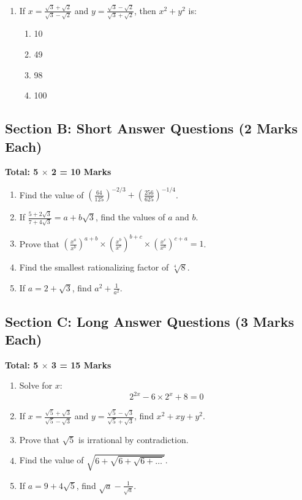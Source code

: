 \documentclass[12pt]{article}
\begin{document}
\begin{enumerate}[label=\arabic*.]
		\item If $x = \frac{\sqrt{3} + \sqrt{2}}{\sqrt{3} - \sqrt{2}}$ and $y = \frac{\sqrt{3} - \sqrt{2}}{\sqrt{3} + \sqrt{2}}$, then $x^2 + y^2$ is:
		\begin{enumerate}[label=\alph*)]
			\item 10
			\item 49
			\item 98
			\item 100
		\end{enumerate}
	\end{enumerate}
	
	\subsection*{Section B: Short Answer Questions (2 Marks Each)}
	\textbf{Total: 5 $\times$ 2 = 10 Marks}
	
	\begin{enumerate}[start=6]
		\item Find the value of $\left( \frac{64}{125} \right)^{-2/3} + \left( \frac{256}{625} \right)^{-1/4}$.
		
		\item If $\frac{5+2\sqrt{3}}{7+4\sqrt{3}} = a + b\sqrt{3}$, find the values of $a$ and $b$.
		
		\item Prove that $\left( \frac{x^a}{x^b} \right)^{a+b} \times \left( \frac{x^b}{x^c} \right)^{b+c} \times \left( \frac{x^c}{x^a} \right)^{c+a} = 1$.
		
		\item Find the smallest rationalizing factor of $\sqrt[4]{8}$.
		
		\item If $a = 2 + \sqrt{3}$, find $a^2 + \frac{1}{a^2}$.
	\end{enumerate}
	
	\subsection*{Section C: Long Answer Questions (3 Marks Each)}
	\textbf{Total: 5 $\times$ 3 = 15 Marks}
	
	\begin{enumerate}[start=11]
		\item Solve for $x$:
		\[ 2^{2x} - 6 \times 2^x + 8 = 0 \]
		
		\item If $x = \frac{\sqrt{5} + \sqrt{3}}{\sqrt{5} - \sqrt{3}}$ and $y = \frac{\sqrt{5} - \sqrt{3}}{\sqrt{5} + \sqrt{3}}$, find $x^2 + xy + y^2$.
		
		\item Prove that $\sqrt{5}$ is irrational by contradiction.
		
		\item Find the value of $\sqrt{6 + \sqrt{6 + \sqrt{6 + \dots}}}$.
		
		\item If $a = 9 + 4\sqrt{5}$, find $\sqrt{a} - \frac{1}{\sqrt{a}}$.
	\end{enumerate}
	
\end{document}
